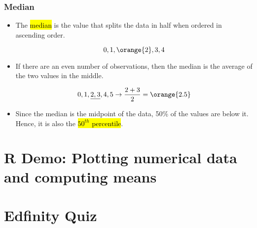 \documentclass[slidestop,compress,mathserif]{beamer}
\begin{document}

\begin{frame}
\frametitle{Median}

\begin{itemize}

\item The \hl{median} is the value that splits the data in half when ordered in ascending order.

\[ 0,1,\orange{2},3,4 \]

\item If there are an even number of observations, then the median is the average of the two values in the middle.

\[ 0,1,\underline{2,3},4,5 \rightarrow \frac{2 + 3}{2} = \orange{2.5} \]

\item Since the median is the midpoint of the data, 50\% of the values are below it. Hence, it is also the \hl{$50^{th}$ percentile}.

\end{itemize}

\end{frame}



\section{R Demo: Plotting numerical data and computing means}

\section{Edfinity Quiz}



\end{document}
